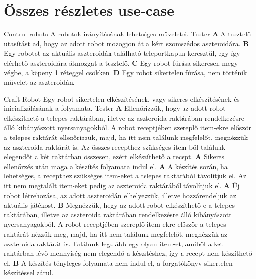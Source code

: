 \documentclass[../../projlab]{subfiles}
\begin{document}
\section{Összes részletes use-case}
\begin{use-case}
    {Control robots}
    {A robotok irányításának lehetséges műveletei. }
    {Tester} 
    \textbf{A} A tesztelő utasítást ad, hogy az adott robot mozogjon át a kért szomszédos aszteroidára.\newline
    \textbf{B} Egy robotot az aktuális aszteroidán található teleportkapun keresztül, egy így elérhető aszteroidára átmozgat a tesztelő. \newline
    \textbf{C} Egy robot fúrása sikeresen megy végbe, a köpeny 1 réteggel csökken. \newline
    \textbf{D} Egy robot sikertelen fúrása, nem történik művelet az aszteroidán. \newline

\end{use-case}

\begin{use-case}
    {Craft Robot}
    {Egy robot sikertelen elkészítésének, vagy sikeres elkészítésének és inicializálásának a folyamata. }
    {Tester} 
    \textbf{A} Ellenőrizzük, hogy az adott robot elkészíthető a telepes raktárában, illetve az aszteroida raktárában rendelkezésre álló kibányászott nyersanyagokból. A robot receptjében szereplő item-ekre először a telepes raktárát ellenőrizzük, majd, ha itt nem találunk megfelelőt, megnézzük az aszteroida raktárát is. Az összes recepthez szükséges item-ből találunk elegendőt a két raktárban összesen, ezért elkészíthető a recept.  \newline
    \textbf{A} Sikeres ellenőrzés után maga a készítés folyamata indul el.  \newline
    \textbf{A} A készítés során, ha lehetséges, a recepthez szükséges item-eket a telepes raktárából távolítjuk el. Az itt nem megtalált item-eket pedig az aszteroida raktárából távolítjuk el.  \newline
    \textbf{A} Új robot létrehozása, az adott aszteroidán elhelyezzük, illetve hozzárendeljük az aktuális játékost.  \newline
    \textbf{B} Megnézzük, hogy az adott robot elkészíthető-e a telepes raktárában, illetve az aszteroida raktárában rendelkezésre álló kibányászott nyersanyagokból. A robot receptjében szereplő item-ekre először a telepes raktárát nézzük meg, majd, ha itt nem találunk megfelelőt, megnézzük az aszteroida raktárát is. Találunk legalább egy olyan item-et, amiből a két raktárban lévő mennyiség nem elegendő a készítéshez, így a recept nem készíthető el.  \newline
    \textbf{B} A készítés tényleges folyamata nem indul el, a forgatókönyv sikertelen készítéssel zárul. \newline
\end{use-case}
\end{document}
